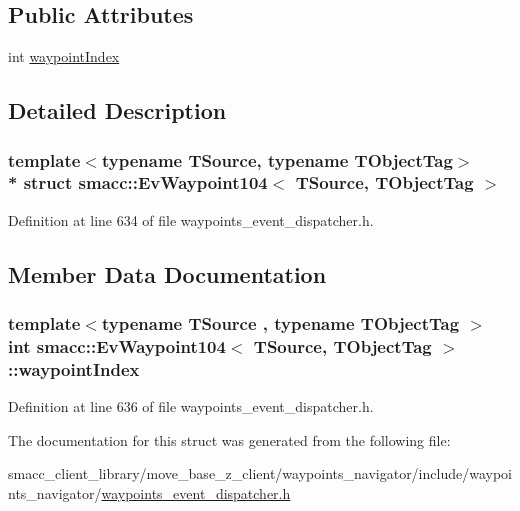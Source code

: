 \subsection*{Public Attributes}
\begin{DoxyCompactItemize}
\item 
int \hyperlink{structsmacc_1_1EvWaypoint104_af3a0c381ecdeb5b5ca872acc20b488f0}{waypoint\+Index}
\end{DoxyCompactItemize}


\subsection{Detailed Description}
\subsubsection*{template$<$typename T\+Source, typename T\+Object\+Tag$>$\\*
struct smacc\+::\+Ev\+Waypoint104$<$ T\+Source, T\+Object\+Tag $>$}



Definition at line 634 of file waypoints\+\_\+event\+\_\+dispatcher.\+h.



\subsection{Member Data Documentation}
\subsubsection[{\texorpdfstring{waypoint\+Index}{waypointIndex}}]{\setlength{\rightskip}{0pt plus 5cm}template$<$typename T\+Source , typename T\+Object\+Tag $>$ int {\bf smacc\+::\+Ev\+Waypoint104}$<$ T\+Source, T\+Object\+Tag $>$\+::waypoint\+Index}\hypertarget{structsmacc_1_1EvWaypoint104_af3a0c381ecdeb5b5ca872acc20b488f0}{}\label{structsmacc_1_1EvWaypoint104_af3a0c381ecdeb5b5ca872acc20b488f0}


Definition at line 636 of file waypoints\+\_\+event\+\_\+dispatcher.\+h.



The documentation for this struct was generated from the following file\+:\begin{DoxyCompactItemize}
\item 
smacc\+\_\+client\+\_\+library/move\+\_\+base\+\_\+z\+\_\+client/waypoints\+\_\+navigator/include/waypoints\+\_\+navigator/\hyperlink{waypoints__event__dispatcher_8h}{waypoints\+\_\+event\+\_\+dispatcher.\+h}\end{DoxyCompactItemize}
